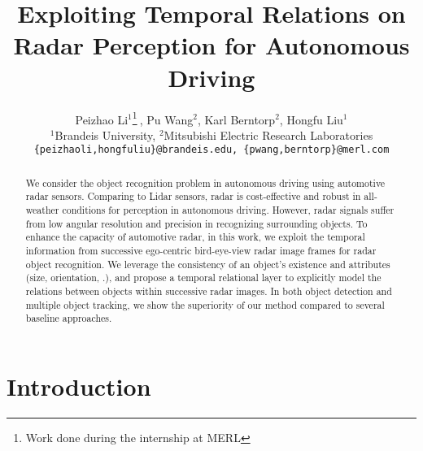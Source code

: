 \documentclass[10pt,twocolumn,letterpaper]{article}
\begin{document}
\title{Exploiting Temporal Relations on Radar Perception for Autonomous Driving}

\author{Peizhao Li$^1$\thanks{Work done during the internship at MERL}$\ $, Pu Wang$^2$, Karl Berntorp$^2$, Hongfu Liu$^1$\\
$^1$Brandeis University, $^2$Mitsubishi Electric Research Laboratories\\
{\tt\small \{peizhaoli,hongfuliu\}@brandeis.edu, \{pwang,berntorp\}@merl.com}
}
\maketitle

\begin{abstract}
We consider the object recognition problem in autonomous driving using automotive radar sensors. Comparing to Lidar sensors, radar is cost-effective and robust in all-weather conditions for perception in autonomous driving. However, radar signals suffer from low angular resolution and precision in recognizing surrounding objects. To enhance the capacity of automotive radar, in this work, we exploit the temporal information from successive ego-centric bird-eye-view radar image frames for radar object recognition. We leverage the consistency of an object's existence and attributes (size, orientation, \etc.), and propose a temporal relational layer to explicitly model the relations between objects within successive radar images. In both object detection and multiple object tracking, we show the superiority of our method compared to several baseline approaches.
\end{abstract}

\vspace{-5mm}
\section{Introduction}
\label{sec:intro}
\end{document}
